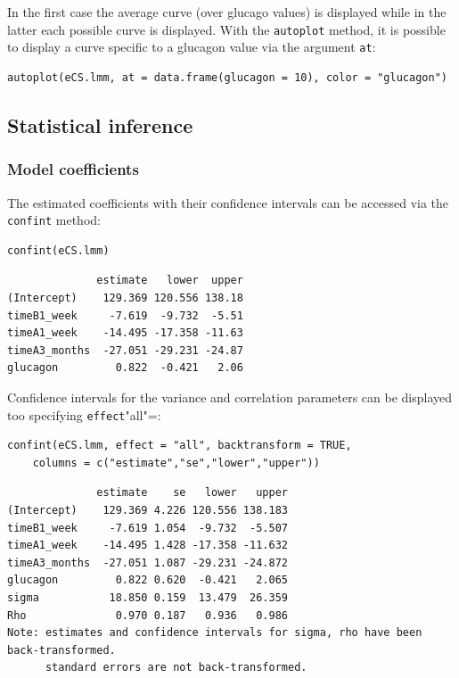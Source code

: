 \documentclass[12pt]{article}
\begin{document}
In the first case the average curve (over glucago values) is displayed
while in the latter each possible curve is displayed. With the
\texttt{autoplot} method, it is possible to display a curve specific to a
glucagon value via the argument \texttt{at}:
\lstset{language=r,label= ,caption= ,captionpos=b,numbers=none}
\begin{lstlisting}
autoplot(eCS.lmm, at = data.frame(glucagon = 10), color = "glucagon")
\end{lstlisting}

\subsection{Statistical inference}
\label{sec:org26a90cd}

\subsubsection{Model coefficients}
\label{sec:org67a1c3c}

The estimated coefficients with their confidence intervals can be accessed via the \texttt{confint} method:
\lstset{language=r,label= ,caption= ,captionpos=b,numbers=none}
\begin{lstlisting}
confint(eCS.lmm)
\end{lstlisting}

\begin{verbatim}
              estimate   lower  upper
(Intercept)    129.369 120.556 138.18
timeB1_week     -7.619  -9.732  -5.51
timeA1_week    -14.495 -17.358 -11.63
timeA3_months  -27.051 -29.231 -24.87
glucagon         0.822  -0.421   2.06
\end{verbatim}


Confidence intervals for the variance and correlation parameters can
be displayed too specifying \texttt{effect}"all"=:
\lstset{language=r,label= ,caption= ,captionpos=b,numbers=none}
\begin{lstlisting}
confint(eCS.lmm, effect = "all", backtransform = TRUE,
	columns = c("estimate","se","lower","upper"))
\end{lstlisting}

\begin{verbatim}
              estimate    se   lower   upper
(Intercept)    129.369 4.226 120.556 138.183
timeB1_week     -7.619 1.054  -9.732  -5.507
timeA1_week    -14.495 1.428 -17.358 -11.632
timeA3_months  -27.051 1.087 -29.231 -24.872
glucagon         0.822 0.620  -0.421   2.065
sigma           18.850 0.159  13.479  26.359
Rho              0.970 0.187   0.936   0.986
Note: estimates and confidence intervals for sigma, rho have been back-transformed. 
      standard errors are not back-transformed.
\end{verbatim}
\end{document}
